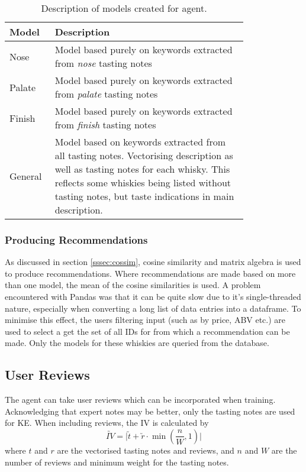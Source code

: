 \begin{table}
    \centering
    \caption{Description of models created for agent.}\label{tab:models}
    \begin{tabular}{p{0.1\linewidth} p{0.7\linewidth}} 
    \toprule
    Model   & Description            \\ \midrule
    Nose    & Model based purely on keywords extracted from \emph{nose} tasting notes  \\
    Palate  & Model based purely on keywords extracted from \emph{palate} tasting notes  \\
    Finish  & Model based purely on keywords extracted from \emph{finish} tasting notes  \\
    General & Model based on keywords extracted from all tasting notes.  Vectorising description as well as tasting notes for each whisky. This reflects some whiskies being listed without tasting notes, but taste indications in main description. \\
    \bottomrule
    \end{tabular}
\end{table}

\subsubsection{Producing Recommendations}
As discussed in section \ref{sssec:cossim}, cosine similarity and matrix algebra is used to produce recommendations.
Where recommendations are made based on more than one model, the mean of the cosine similarities is used.
A problem encountered with Pandas was that it can be quite slow due to it's single-threaded nature, especially
when converting a long list of data entries into a dataframe. To minimise this effect, the users filtering input (such
as by price, ABV etc.) are used to select a get the set of all IDs for from which a recommendation can be made.
Only the models for these whiskies are queried from the database.

\subsection{User Reviews}
The agent can take user reviews which can be incorporated when training. Acknowledging that expert notes may be better,
only the tasting notes are used for KE. When including reviews, the IV is calculated by
\begin{equation}\label{eqn:revweight}
    \utilde{IV} = \vert \utilde{t} + \utilde{r} \cdot \min(\frac{n}{W}, 1) \vert 
\end{equation}
where $t$ and $r$ are the vectorised tasting notes and reviews, and $n$ and $W$ are the number of reviews and minimum weight 
for the tasting notes.

